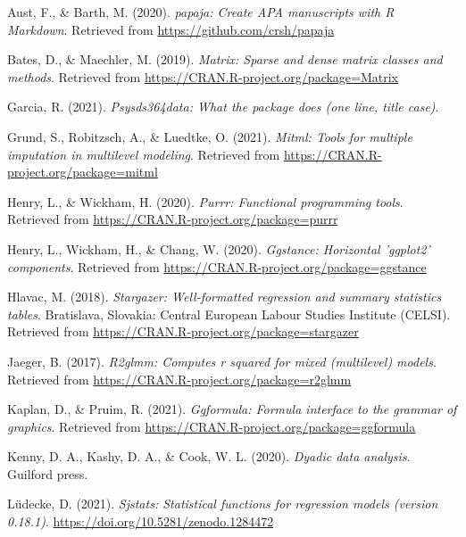\documentclass[
  english,
  man]{apa6}
\newlength{\cslhangindent}
\newenvironment{cslreferences}%
  {\setlength{\parindent}{0pt}%
  \everypar{\setlength{\hangindent}{\cslhangindent}}\ignorespaces}%
  {\par}
\begin{document}
\hypertarget{refs}{}
\begin{cslreferences}
\leavevmode\hypertarget{ref-R-papaja}{}%
Aust, F., \& Barth, M. (2020). \emph{papaja: Create APA manuscripts with R Markdown}. Retrieved from \url{https://github.com/crsh/papaja}

\leavevmode\hypertarget{ref-R-Matrix}{}%
Bates, D., \& Maechler, M. (2019). \emph{Matrix: Sparse and dense matrix classes and methods}. Retrieved from \url{https://CRAN.R-project.org/package=Matrix}

\leavevmode\hypertarget{ref-R-psysds364data}{}%
Garcia, R. (2021). \emph{Psysds364data: What the package does (one line, title case)}.

\leavevmode\hypertarget{ref-R-mitml}{}%
Grund, S., Robitzsch, A., \& Luedtke, O. (2021). \emph{Mitml: Tools for multiple imputation in multilevel modeling}. Retrieved from \url{https://CRAN.R-project.org/package=mitml}

\leavevmode\hypertarget{ref-R-purrr}{}%
Henry, L., \& Wickham, H. (2020). \emph{Purrr: Functional programming tools}. Retrieved from \url{https://CRAN.R-project.org/package=purrr}

\leavevmode\hypertarget{ref-R-ggstance}{}%
Henry, L., Wickham, H., \& Chang, W. (2020). \emph{Ggstance: Horizontal 'ggplot2' components}. Retrieved from \url{https://CRAN.R-project.org/package=ggstance}

\leavevmode\hypertarget{ref-R-stargazer}{}%
Hlavac, M. (2018). \emph{Stargazer: Well-formatted regression and summary statistics tables}. Bratislava, Slovakia: Central European Labour Studies Institute (CELSI). Retrieved from \url{https://CRAN.R-project.org/package=stargazer}

\leavevmode\hypertarget{ref-R-r2glmm}{}%
Jaeger, B. (2017). \emph{R2glmm: Computes r squared for mixed (multilevel) models}. Retrieved from \url{https://CRAN.R-project.org/package=r2glmm}

\leavevmode\hypertarget{ref-R-ggformula}{}%
Kaplan, D., \& Pruim, R. (2021). \emph{Ggformula: Formula interface to the grammar of graphics}. Retrieved from \url{https://CRAN.R-project.org/package=ggformula}

\leavevmode\hypertarget{ref-kenny2020dyadic}{}%
Kenny, D. A., Kashy, D. A., \& Cook, W. L. (2020). \emph{Dyadic data analysis}. Guilford press.

\leavevmode\hypertarget{ref-R-sjstats}{}%
Lüdecke, D. (2021). \emph{Sjstats: Statistical functions for regression models (version 0.18.1)}. \url{https://doi.org/10.5281/zenodo.1284472}


\end{cslreferences}
\end{document}
